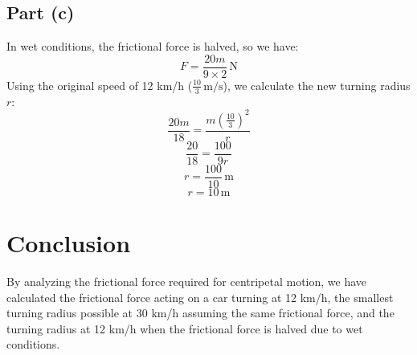 \documentclass{article}
\begin{document}
\subsection*{Part (c)}
In wet conditions, the frictional force is halved, so we have:
\[ F = \frac{20m}{9 \times 2} \, \text{N} \]
Using the original speed of 12 km/h (\( \frac{10}{3} \, \text{m/s} \)), we calculate the new turning radius \( r \):
\[ \frac{20m}{18} = \frac{m\left(\frac{10}{3}\right)^2}{r} \]
\[ \frac{20}{18} = \frac{100}{9r} \]
\[ r = \frac{100}{10} \, \text{m} \]
\[ r = 10 \, \text{m} \]

\section*{Conclusion}
By analyzing the frictional force required for centripetal motion, we have calculated the frictional force acting on a car turning at 12 km/h, the smallest turning radius possible at 30 km/h assuming the same frictional force, and the turning radius at 12 km/h when the frictional force is halved due to wet conditions.
\end{document}
